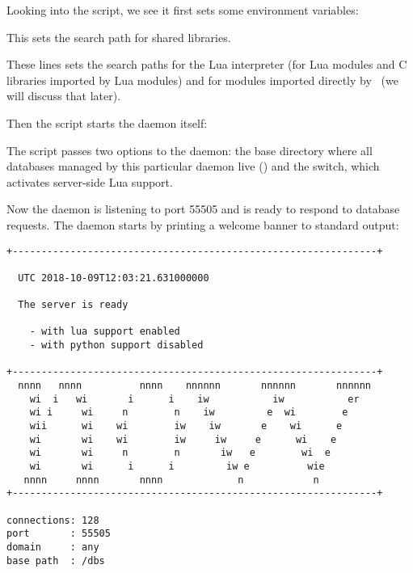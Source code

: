 Looking into the script,
we see it first sets some environment variables:


This sets the search path for shared libraries.




These lines sets the search paths for the Lua interpreter
(for Lua modules and C libraries imported by Lua modules)
and for  modules imported directly by \nowdb\
(we will discuss that later).

Then the script starts the daemon itself:


The script passes two options to the daemon:
the base directory where all databases
managed by this particular daemon live ()
and the  switch, which activates
server-side Lua support.

Now the daemon is listening to port 55505
and is ready to respond to database requests.
The daemon starts by printing a welcome banner
to standard output:

\begingroup
\small
\begin{minipage}{\textwidth}
\begin{verbatim}
+---------------------------------------------------------------+ 
 
  UTC 2018-10-09T12:03:21.631000000
 
  The server is ready
 
    - with lua support enabled
    - with python support disabled
 
+---------------------------------------------------------------+ 
  nnnn   nnnn          nnnn    nnnnnn       nnnnnn       nnnnnn  
    wi  i   wi       i      i    iw           iw           er   
    wi i     wi     n        n    iw         e  wi        e    
    wii      wi    wi        iw    iw       e    wi      e        
    wi       wi    wi        iw     iw     e      wi    e        
    wi       wi     n        n       iw   e        wi  e        
    wi       wi      i      i         iw e          wie          
   nnnn     nnnn       nnnn             n            n            
+---------------------------------------------------------------+ 

connections: 128
port       : 55505
domain     : any
base path  : /dbs
\end{verbatim}
\end{minipage}
\endgroup


